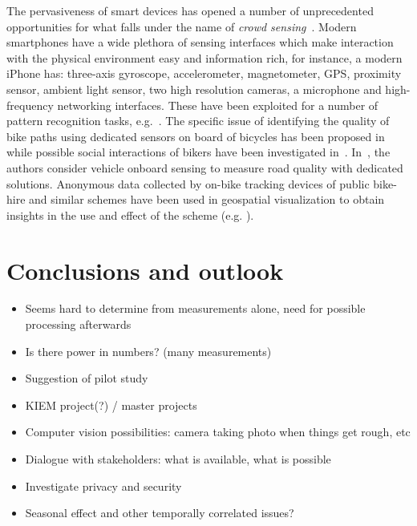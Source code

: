 \documentclass[a4paper,11pt]{article}
\begin{document}
The pervasiveness of smart devices has opened a number of unprecedented
opportunities for what falls under the name of \emph{crowd sensing}~\cite{gan:mob11}.
Modern smartphones have a wide plethora of sensing interfaces which make interaction with the physical
environment easy and information rich, for instance, a modern iPhone has: three-axis gyroscope, accelerometer, magnetometer, GPS, proximity
sensor, ambient light sensor, two high resolution cameras, a
microphone and high-frequency networking interfaces. These have been
exploited for a number of pattern recognition tasks, e.g.~\cite{fuj:iph10}. The specific issue of identifying the quality
of bike paths using dedicated sensors on board of bicycles has been
proposed in~\cite{eis:bik07} while possible social interactions of
bikers have been investigated
in~\cite{red:bik10}. In~\cite{eri:pot08}, the authors consider vehicle
onboard sensing to measure road quality with dedicated solutions.
Anonymous data collected by on-bike tracking devices of public bike-hire and similar schemes have been used in geospatial visualization to obtain insights in the use and effect of the scheme (e.g. \cite{krueger2014,wood2010}).

\section{Conclusions and outlook}

\begin{itemize}\setlength{\itemsep}{-3pt}
\item Seems hard to determine from measurements alone, need for possible processing afterwards
\item Is there power in numbers? (many measurements)
\item Suggestion of pilot study
\item KIEM project(?) / master projects
\item Computer vision possibilities: camera taking photo when things get rough, etc
\item Dialogue with stakeholders: what is available, what is possible
\item Investigate privacy and security
\item Seasonal effect and other temporally correlated issues?
\end{itemize}



\end{document}
